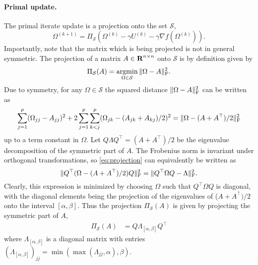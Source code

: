 \documentclass{article}
\begin{document}
\paragraph{Primal update.} The primal iterate update is a projection onto the
set $\mathcal{S}$,
\[
    \Omega^{(k+1)} = \Pi_{\mathcal{S}}\left(\Omega^{(k)} - \gamma U^{(k)} - \gamma \nabla f(\Omega^{(k)}) \right).
\]
Importantly, note that the matrix which is being projected is not in general
symmetric. The projection of a matrix $A \in {\mbox{\bf R}}^{n \times n}$ onto 
$\mathcal{S}$ is by definition given by
\[
    \Pi_{\mathcal{S}}(A) = \argmin_{\Omega \in \mathcal{S}} \|\Omega - A\|_{\rm F}^2.
\]
Due to symmetry, for any $\Omega \in \mathcal{S}$ the squared distance 
$\|\Omega - A\|_{\rm F}^2$ can be written as 
\begin{equation}\label{eq:projection}
    \sum_{j=1}^{p}(\Omega_{jj} - A_{jj})^2  + 2\sum_{j=1}^{p}\sum_{k<j}^{p} (\Omega_{jk} - (A_{jk} + A_{kj}) / 2)^2 = \|\Omega - (A + A^\top) / 2\|_{\rm F}^2
\end{equation}
up to a term constant in $\Omega$. Let $Q \Lambda Q^\top = (A+
A^\top) / 2$ be the eigenvalue decomposition of the symmetric part of $A$. The
Frobenius norm is invariant under orthogonal transformations, so
\eqref{eq:projection} can equivalently be written as
\[
    \|Q^\top(\Omega - (A + A^\top) / 2)Q\|_{\rm F}^2 = \|Q^\top\Omega Q - \Lambda\|_{\rm F}^2.
\]
Clearly, this expression is minimized by choosing $\Omega$ such that $Q^\top
\Omega Q$ is diagonal, with the diagonal elements being the projection of the
eigenvalues of ($A + A^\top) / 2$ onto the interval $[\alpha, \beta]$. Thus the
projection $\Pi_{\mathcal{S}}(A)$ is given by projecting the symmetric part of
$A$, 
\begin{align*}
    \Pi_{\mathcal{S}}(A) &= Q \Lambda_{[\alpha, \beta]} Q^\top
\end{align*}
where $\Lambda_{[\alpha, \beta]}$ is a diagonal matrix with entries
$(\Lambda_{[\alpha, \beta]})_{jj} = \min(\max(\Lambda_{jj}, \alpha), \beta)$. 
\end{document}
